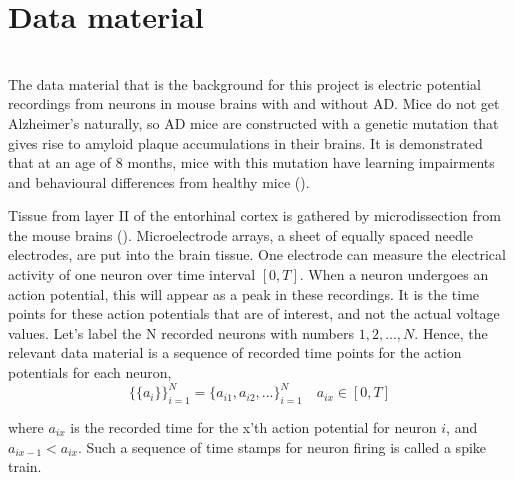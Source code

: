 \section{Data material}

\label{Lab}\\
The data material that is the background for this project is electric potential recordings from neurons in mouse brains with and without AD. Mice do not get Alzheimer's naturally, so AD mice are constructed with a genetic mutation that gives rise to amyloid plaque accumulations in their brains. It is demonstrated that at an age of 8 months, mice with this mutation have learning impairments and behavioural differences from healthy mice (\cite{Radde}). 

Tissue from layer II of the entorhinal cortex is gathered by microdissection from the mouse brains (\cite{Katrine}). Microelectrode arrays, a sheet of equally spaced needle electrodes, are put into the brain tissue. One electrode can measure the electrical activity of one neuron over time interval $[0,T]$. When a neuron undergoes an action potential, this will appear as a peak in these recordings. It is the time points for these action potentials that are of interest, and not the actual voltage values. Let's label the N recorded neurons with numbers $1,2,...,N$. Hence, the relevant data material is a sequence of recorded time points for the action potentials for each neuron,
\begin{equation}
    \{\{a_i\}\}_{i=1}^{N} = \{a_{i1}, a_{i2}, ...\}_{i=1}^{N} \quad a_{ix} \in [0,T]
\end{equation}

where $a_{ix}$ is the recorded time for the x'th action potential for neuron $i$, and $a_{ix-1} < a_{ix}$. Such a sequence of time stamps for neuron firing is called a spike train.\\







\cleardoublepage